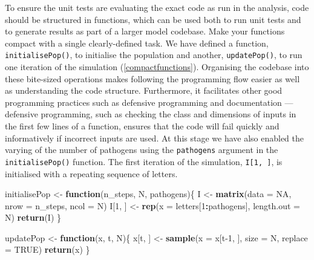 \documentclass[]{elsarticle} %
\newenvironment{Shaded}{\begin{snugshade}}{\end{snugshade}}
\newcommand{\ControlFlowTok}[1]{\textcolor[rgb]{0.13,0.29,0.53}{\textbf{#1}}}
\newcommand{\DataTypeTok}[1]{\textcolor[rgb]{0.13,0.29,0.53}{#1}}
\newcommand{\DecValTok}[1]{\textcolor[rgb]{0.00,0.00,0.81}{#1}}
\newcommand{\KeywordTok}[1]{\textcolor[rgb]{0.13,0.29,0.53}{\textbf{#1}}}
\newcommand{\NormalTok}[1]{#1}
\newcommand{\OperatorTok}[1]{\textcolor[rgb]{0.81,0.36,0.00}{\textbf{#1}}}
\newcommand{\OtherTok}[1]{\textcolor[rgb]{0.56,0.35,0.01}{#1}}
\newcommand{\StringTok}[1]{\textcolor[rgb]{0.31,0.60,0.02}{#1}}
\begin{document}
To ensure the unit tests are evaluating the exact code as run in the analysis, code should be structured in functions, which can be used both to run unit tests and to generate results as part of a larger model codebase.
Make your functions compact with a single clearly-defined task.
We have defined a function, \texttt{initialisePop()}, to initialise the population and another, \texttt{updatePop()}, to run one iteration of the simulation (\ref{compactfunctions}).
Organising the codebase into these bite-sized operations makes following the programming flow easier as well as understanding the code structure.
Furthermore, it facilitates other good programming practices such as defensive programming and documentation --- defensive programming, such as checking the class and dimensions of inputs in the first few lines of a function, ensures that the code will fail quickly and informatively if incorrect inputs are used.
At this stage we have also enabled the varying of the number of pathogens using the \texttt{pathogens} argument in the \texttt{initialisePop()} function.
The first iteration of the simulation, \texttt{I{[}1,\ {]}}, is initialised with a repeating sequence of letters.
\newline
{}\label{compactfunctions}

\begin{Shaded}
\begin{Highlighting}[]
\NormalTok{initialisePop <-}\StringTok{ }\ControlFlowTok{function}\NormalTok{(n_steps, N, pathogens)\{}
\NormalTok{  I <-}\StringTok{ }\KeywordTok{matrix}\NormalTok{(}\DataTypeTok{data =} \OtherTok{NA}\NormalTok{, }\DataTypeTok{nrow =}\NormalTok{ n_steps, }\DataTypeTok{ncol =}\NormalTok{ N)}
\NormalTok{  I[}\DecValTok{1}\NormalTok{, ] <-}\StringTok{ }\KeywordTok{rep}\NormalTok{(}\DataTypeTok{x =}\NormalTok{ letters[}\DecValTok{1}\OperatorTok{:}\NormalTok{pathogens], }\DataTypeTok{length.out =}\NormalTok{ N)}
  \KeywordTok{return}\NormalTok{(I)}
\NormalTok{\}}

\NormalTok{updatePop <-}\StringTok{ }\ControlFlowTok{function}\NormalTok{(x, t, N)\{}
\NormalTok{  x[t, ] <-}\StringTok{ }\KeywordTok{sample}\NormalTok{(}\DataTypeTok{x =}\NormalTok{ x[t}\DecValTok{-1}\NormalTok{, ], }\DataTypeTok{size =}\NormalTok{ N, }\DataTypeTok{replace =} \OtherTok{TRUE}\NormalTok{)}
  \KeywordTok{return}\NormalTok{(x)}
\NormalTok{\}}
\end{Highlighting}
\end{Shaded}
\end{document}
